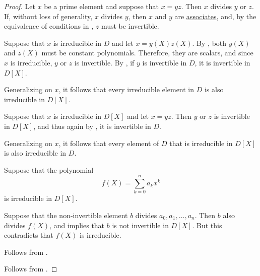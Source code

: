 \begin{proof}
   Let \( x \) be a prime element and suppose that \( x = yz \). Then \( x \) divides \( y \) or \( z \). If, without loss of generality, \( x \) divides \( y \), then \( x \) and \( y \) are \hyperref[def:domain_divisibility/associates]{associates}, and, by the equivalence of conditions in , \( z \) must be invertible.


  \SufficiencySubProof* Suppose that \( x \) is irreducible in \( D \) and let \( x = y(X) z(X) \). By , both \( y(X) \) and \( z(X) \) must be constant polynomials. Therefore, they are scalars, and since \( x \) is irreducible, \( y \) or \( z \) is invertible. By , if \( y \) is invertible in \( D \), it is invertible in \( D[X] \).

  Generalizing on \( x \), it follows that every irreducible element in \( D \) is also irreducible in \( D[X] \).

  \NecessitySubProof* Suppose that \( x \) is irreducible in \( D[X] \) and let \( x = yz \). Then \( y \) or \( z \) is invertible in \( D[X] \), and thus again by , it is invertible in \( D \).

  Generalizing on \( x \), it follows that every element of \( D \) that is irreducible in \( D[X] \) is also irreducible in \( D \).

   Suppose that the polynomial
  \begin{equation*}
    f(X) = \sum_{k=0}^n a_k x^k
  \end{equation*}
  is irreducible in \( D[X] \).

  Suppose that the non-invertible element \( b \) divides \( a_0, a_1, \ldots, a_n \). Then \( b \) also divides \( f(X) \), and  implies that \( b \) is not invertible in \( D[X] \). But this contradicts that \( f(X) \) is irreducible.

   Follows from .

   Follows from .
\end{proof}

